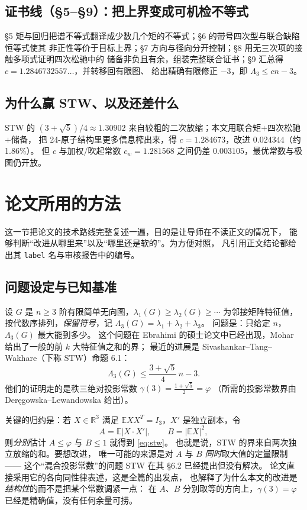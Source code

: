 \documentclass[UTF8,11pt]{ctexart}
\newcommand{\Lam}{\Lambda}
\newcommand{\R}{\mathbb{R}}
\newcommand{\E}{\mathbb{E}}
\newcommand{\file}[1]{\texttt{#1}}
\begin{document}
\subsection{证书线（\S5--\S9）：把上界变成可机检不等式}
\S5 矩与回归把谱不等式翻译成少数几个矩的不等式；\S6 的带号四次型与联合缺陷恒等式使其
非正性等价于目标上界；\S7 方向与径向分开控制；\S8 用无三次项的接触多项式证明四次松驰中的
储备非负且有余，组装完整联合证书；\S9 汇总得 $c=1.2846732557\ldots$，并转移回有限图、
给出精确有限修正 $-3$，即 $\Lambda_3\le cn-3$。

\subsection{为什么赢 STW、以及还差什么}
STW 的 $(3+\sqrt5)/4\approx1.30902$ 来自较粗的二次放缩；本文用联合矩$+$四次松驰$+$储备，
把 24-原子结构里更多信息榨出来，得 $c=1.284673$，改进 $0.024344$（约 1.86\%）。
但 $c$ 与加权/吹起常数 $c_w=1.281568$ 之间仍差 $0.003105$，最优常数与极图仍开放。

\section{论文所用的方法}

这一节把论文的技术路线完整复述一遍，目的是让导师在不读正文的情况下，
能够判断``改进从哪里来''以及``哪里还是软的''。为方便对照，
凡引用正文结论都给出其 \file{label} 名与审核报告中的编号。

\subsection{问题设定与已知基准}

设 $G$ 是 $n\ge3$ 阶有限简单无向图，$\lambda_1(G)\ge\lambda_2(G)\ge\cdots$ 为邻接矩阵特征值，
按代数序排列，\emph{保留符号}，记 $\Lam_3(G)=\lambda_1+\lambda_2+\lambda_3$。
问题是：只给定 $n$，$\Lam_3(G)$ 最大能到多少。
这个问题在 Ebrahimi 的硕士论文中已经出现，Mohar 给出了一般的前 $k$ 大特征值之和的界；
最近的进展是 Sivashankar--Tang--Wakhare（下称 STW）命题 6.1：
\begin{equation}\label{eq:stw}
 \Lam_3(G)\le\frac{3+\sqrt5}{4}\,n-3 .
\end{equation}
他们的证明走的是秩三绝对投影常数 $\gamma(3)=\frac{1+\sqrt5}{2}=\varphi$
（所需的投影常数界由 Der\k{e}gowska--Lewandowska 给出）。

关键的归约是：若 $X\in\R^3$ 满足 $\E XX^T=I_3$，$X'$ 是独立副本，令
\[
 A=\E|X\cdot X'|,\qquad B=|\E X|^2 ,
\]
则\emph{分别}估计 $A\le\varphi$ 与 $B\le1$ 就得到 \eqref{eq:stw}。
也就是说，STW 的界来自两次独立放缩的和。要想改进，
唯一可能的来源是对 $A$ 与 $B$ \emph{同时}取大值的定量限制——
这个``混合投影常数''的问题 STW 在其 \S6.2 已经提出但没有解决。
论文直接采用它的各向同性律表述，这是全篇的出发点，
也解释了为什么本文的改进是\emph{结构性}的而不是把某个常数调紧一点：
在 $A$、$B$ 分别取等的方向上，$\gamma(3)=\varphi$ 已经是精确值，没有任何余量可捞。
\end{document}
